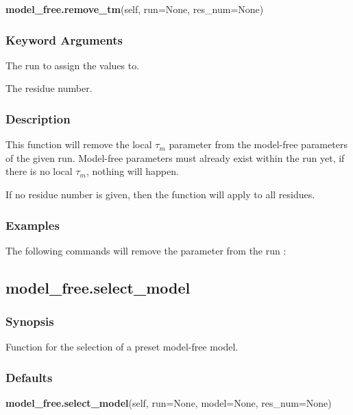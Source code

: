 \textsf{\textbf{model\_free.remove\_tm}(self, run=None, res\_num=None)}


\subsubsection{Keyword Arguments}


  The run to assign the values to.

  The residue number.

\subsubsection{Description}

This function will remove the local $\tau_m$ parameter from the model-free parameters of the given
run.  Model-free parameters must already exist within the run yet, if there is no local $\tau_m$,
nothing will happen.

If no residue number is given, then the function will apply to all residues.


\subsubsection{Examples}

The following commands will remove the parameter 
 from the run 
:





\newpage

\subsection{model\_free.select\_model}


\subsubsection{Synopsis}

Function for the selection of a preset model-free model.

\subsubsection{Defaults}

\textsf{\textbf{model\_free.select\_model}(self, run=None, model=None, res\_num=None)}


